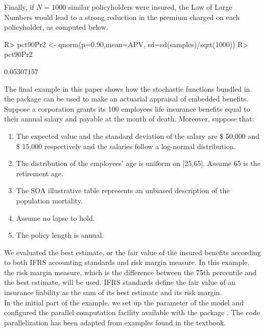 \documentclass[nojss]{jss}
\begin{document}
Finally, if $N=1000$ similar policyholders were insured, the Law of Large
Numbers would lead to a strong reduction in the premium charged on each
policyholder, as computed below.

\begin{Schunk}
\begin{Sinput}
R> pct90Pr2 <- qnorm(p=0.90,mean=APV, sd=sd(samples)/sqrt(1000))
R> pct90Pr2
\end{Sinput}
\begin{Soutput}
[1] 0.05307157
\end{Soutput}
\end{Schunk}


The final example in this paper shows how the stochastic functions bundled in
the  package can be used to make an actuarial appraisal of embedded benefits.\\
Suppose a corporation grants its 100 employees life insurance benefits equal to
their annual salary and payable at the month of death. Moreover, suppose that:
\begin{enumerate}
	\item The expected value and the standard deviation of the salary are \$ 50,000 and \$ 15,000 respectively and the 
	salaries follow a log-normal distribution.
	\item The distribution of the employees' age  is uniform on [25,65]. Assume 65 is the retirement age.
	\item The SOA illustrative table represents an unbiased description of the
	population mortality.
	\item Assume no lapse to hold.
	\item The policy length is annual.
\end{enumerate}

We evaluated the best estimate, or the fair value of the insured benefits according 
to both IFRS accounting standards and risk
margin measure. In this example, the risk margin measure, which is the difference between the 75th percentile and the best estimate, will be used. IFRS
standards \citep{ifrsInsurance} define the fair value of an insurance liability as the sum of its best estimate and its risk margin.\\

In the initial part of the example, we set up the parameter of the model and configured the parallel computation facility available with the package . The code parallelization has been adapted from examples found in the \citep{mccallum2011parallel} textbook.
\end{document}
